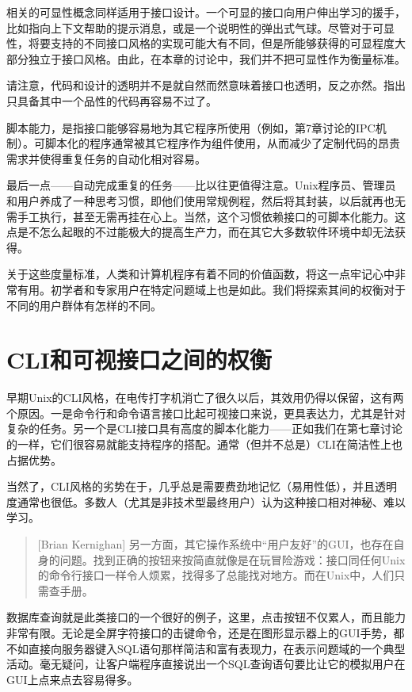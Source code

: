 \documentclass[12pt,oneside]{ctexbook}
\begin{document}
\begin{common-format}
相关的可显性概念同样适用于接口设计。一个可显的接口向用户伸出学习的援手，比如指向上下文帮助的提示消息，或是一个说明性的弹出式气球。尽管对于可显性，将要支持的不同接口风格的实现可能大有不同，但是所能够获得的可显程度大部分独立于接口风格。由此，在本章的讨论中，我们并不把可显性作为衡量标准。

请注意，代码和设计的透明并不是就自然而然意味着接口也透明，反之亦然。指出只具备其中一个品性的代码再容易不过了。

脚本能力，是指接口能够容易地为其它程序所使用（例如，第7章讨论的IPC机制）。可脚本化的程序通常被其它程序作为组件使用，从而减少了定制代码的昂贵需求并使得重复任务的自动化相对容易。

最后一点——自动完成重复的任务——比以往更值得注意。Unix程序员、管理员和用户养成了一种思考习惯，即他们使用常规例程，然后将其封装，以后就再也无需手工执行，甚至无需再挂在心上。当然，这个习惯依赖接口的可脚本化能力。这点是不怎么起眼的不过能极大的提高生产力，而在其它大多数软件环境中却无法获得。

关于这些度量标准，人类和计算机程序有着不同的价值函数，将这一点牢记心中非常有用。初学者和专家用户在特定问题域上也是如此。我们将探索其间的权衡对于不同的用户群体有怎样的不同。

\section{CLI和可视接口之间的权衡}
早期Unix的CLI风格，在电传打字机消亡了很久以后，其效用仍得以保留，这有两个原因。一是命令行和命令语言接口比起可视接口来说，更具表达力，尤其是针对复杂的任务。另一个是CLI接口具有高度的脚本化能力——正如我们在第七章讨论的一样，它们很容易就能支持程序的搭配。通常（但并不总是）CLI在简洁性上也占据优势。

当然了，CLI风格的劣势在于，几乎总是需要费劲地记忆（易用性低），并且透明度通常也很低。多数人（尤其是非技术型最终用户）认为这种接口相对神秘、难以学习。

\begin{quote}[Brian Kernighan]
另一方面，其它操作系统中“用户友好”的GUI，也存在自身的问题。找到正确的按钮来按简直就像是在玩冒险游戏：接口同任何Unix的命令行接口一样令人烦累，找得多了总能找对地方。而在Unix中，人们只需查手册。
\end{quote}

数据库查询就是此类接口的一个很好的例子，这里，点击按钮不仅累人，而且能力非常有限。无论是全屏字符接口的击键命令，还是在图形显示器上的GUI手势，都不如直接向服务器键入SQL语句那样简洁和富有表现力，在表示问题域的一个典型活动。毫无疑问，让客户端程序直接说出一个SQL查询语句要比让它的模拟用户在GUI上点来点去容易得多。


\end{common-format}
\end{document}
